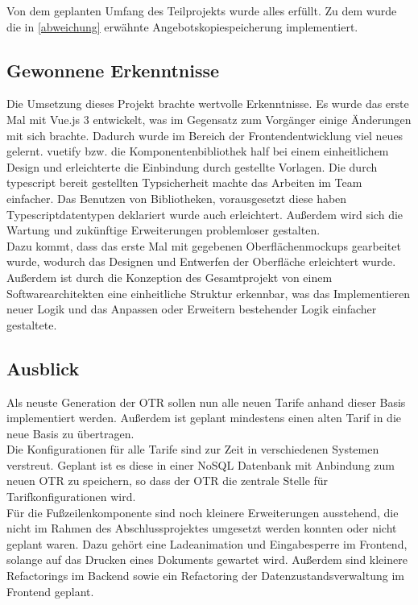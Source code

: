  Von dem geplanten Umfang des Teilprojekts wurde alles erfüllt. Zu dem wurde die in \ref{abweichung}  erwähnte Angebotskopiespeicherung implementiert.
\subsection{Gewonnene Erkenntnisse}
\label{erkenntnisse}
Die Umsetzung dieses Projekt brachte wertvolle Erkenntnisse. Es wurde das erste Mal mit Vue.js 3 entwickelt, was im Gegensatz zum Vorgänger einige Änderungen mit sich brachte. Dadurch wurde im Bereich der Frontendentwicklung viel neues gelernt. \gls{vuetify} bzw. die Komponentenbibliothek half bei einem einheitlichem Design und erleichterte die Einbindung durch gestellte Vorlagen. Die durch \gls{typescript} bereit gestellten Typsicherheit machte das Arbeiten im Team einfacher. Das Benutzen von Bibliotheken, vorausgesetzt diese haben Typescriptdatentypen deklariert wurde auch erleichtert. Außerdem wird sich die Wartung und zukünftige Erweiterungen problemloser gestalten.\\ 
Dazu kommt, dass das erste Mal mit gegebenen Oberflächenmockups gearbeitet wurde, wodurch das Designen und Entwerfen der Oberfläche erleichtert wurde. Außerdem ist durch die Konzeption des Gesamtprojekt von einem Softwarearchitekten eine einheitliche Struktur erkennbar, was das Implementieren neuer Logik und das Anpassen oder Erweitern bestehender Logik einfacher gestaltete.
\subsection{Ausblick}
\label{ausblick}
Als neuste Generation der \ac{OTR} sollen nun alle neuen Tarife anhand dieser Basis implementiert werden. Außerdem ist geplant mindestens einen alten Tarif in die neue Basis zu übertragen.\\
Die Konfigurationen für alle Tarife sind zur Zeit in verschiedenen Systemen verstreut. Geplant ist es diese in einer NoSQL Datenbank mit Anbindung zum neuen \ac{OTR} zu speichern, so dass der \ac{OTR} die zentrale Stelle für Tarifkonfigurationen wird.\\
Für die Fußzeilenkomponente sind noch kleinere Erweiterungen ausstehend, die nicht im Rahmen des Abschlussprojektes umgesetzt werden konnten oder nicht geplant waren. Dazu gehört eine Ladeanimation und Eingabesperre im Frontend, solange auf das Drucken eines Dokuments gewartet wird. Außerdem sind kleinere Refactorings im Backend sowie ein Refactoring der Datenzustandsverwaltung im Frontend geplant.